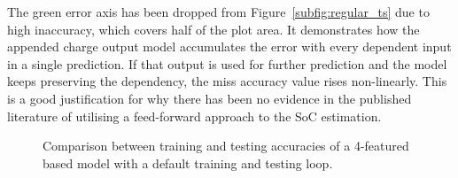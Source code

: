 %
%
%
The green error axis has been dropped from \mbox{Figure~\ref{subfig:regular_ts}} due to high inaccuracy, which covers half of the plot area.
It demonstrates how the appended charge output model accumulates the error with every dependent input in a single prediction.
If that output is used for further prediction and the model keeps preserving the dependency, the miss accuracy value rises non-linearly.
This is a good justification for why there has been no evidence in the published literature of utilising a feed-forward approach to the SoC estimation.
 {
    \begin{figure}[!t]
        \centering
        \label{subfig:regular_tr}
        \hfill
        \label{subfig:regular_ts}
        \caption{Comparison between training and testing accuracies of a 4-featured based model with a default training and testing loop.}
        \label{fig:regular_tr}
    \end{figure}
}

